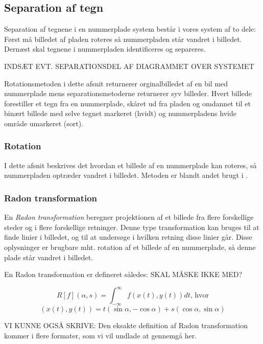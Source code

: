 \subsection{Separation af tegn}

Separation af tegnene i en nummerplade system består i vores system af to dele: Først må billedet af pladen roteres så nummerpladen står vandret i billedet. Dernæst skal tegnene i nummerpladen identificeres og separeres.

INDSÆT EVT. SEPARATIONSDEL AF DIAGRAMMET OVER SYSTEMET

Rotationsmetoden i dette afsnit returnerer orginalbilledet af en bil med nummerplade mens separationsmetoderne returnerer syv billeder. Hvert billede forestiller et tegn fra en nummerplade, skåret ud fra pladen og omdannet til et binært billede med selve tegnet markeret (hvidt) og nummerpladens hvide område umarkeret (sort).

\subsubsection{Rotation}

I dette afsnit beskrives det hvordan et billede af en nummerplade kan roteres, så nummerpladen optræder vandret i billedet. Metoden er blandt andet brugt i \cite{shapiro}.

\subsubsection*{Radon transformation}
En \textit{Radon transformation} beregner projektionen af et billede fra flere forskellige steder og i flere forskellige retninger\cite{matlab_radon}. Denne type transformation kan bruges til at finde linier i billedet, og til at undersøge i hvilken retning disse linier går. Disse oplysninger er brugbare mht. rotation af et billede af en nummerplade, så denne plade står vandret i billedet.

En Radon transformation er defineret således\cite{wiki_radon}: SKAL MÅSKE IKKE MED?

\begin{displaymath}
		R[f](\alpha,s) = \int_{-\infty}^{\infty}f(x(t),y(t))dt \text{, hvor}
\end{displaymath}
\begin{displaymath}
		(x(t),y(t)) = t(\sin\alpha, -\cos\alpha)+s(\cos\alpha,\sin\alpha)
\end{displaymath}

VI KUNNE OGSÅ SKRIVE: Den eksakte definition af Radon transformation kommer i flere formater, som vi vil undlade at gennemgå her.

